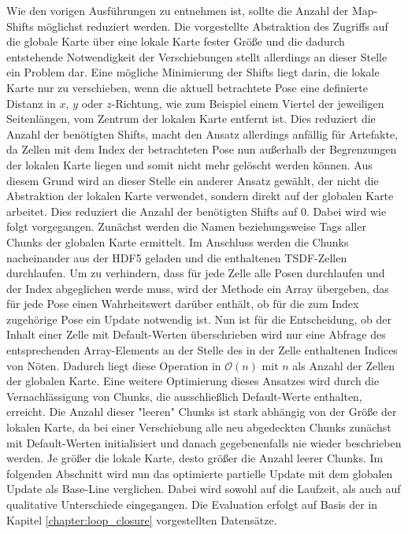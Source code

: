 Wie den vorigen Ausführungen zu entnehmen ist, sollte die Anzahl der Map-Shifts möglichst reduziert werden. Die vorgestellte Abstraktion des Zugriffs auf die globale Karte über eine lokale Karte fester Größe und die dadurch entstehende Notwendigkeit der Verschiebungen stellt allerdings an dieser Stelle ein Problem dar. Eine mögliche Minimierung der Shifts liegt darin, die lokale Karte nur zu verschieben, wenn die aktuell betrachtete Pose eine definierte Distanz in $x$, $y$ oder $z$-Richtung, wie zum Beispiel einem Viertel der jeweiligen Seitenlängen, vom Zentrum der lokalen Karte entfernt ist. Dies reduziert die Anzahl der benötigten Shifts, macht den Ansatz allerdings anfällig für Artefakte, da Zellen mit dem Index der betrachteten Pose nun außerhalb der Begrenzungen der lokalen Karte liegen und somit nicht mehr gelöscht werden können. Aus diesem Grund wird an dieser Stelle ein anderer Ansatz gewählt, der nicht die Abstraktion der lokalen Karte verwendet, sondern direkt auf der globalen Karte arbeitet. Dies reduziert die Anzahl der benötigten Shifts auf $0$. Dabei wird wie folgt vorgegangen. Zunächst werden die Namen beziehungsweise Tags aller Chunks der globalen Karte ermittelt. Im Anschluss werden die Chunks nacheinander aus der HDF5 geladen und die enthaltenen TSDF-Zellen durchlaufen. Um zu verhindern, dass für jede Zelle alle Posen durchlaufen und der Index abgeglichen werde muss, wird der Methode ein Array übergeben, das für jede Pose einen Wahrheitswert darüber enthält, ob für die zum Index zugehörige Pose ein Update notwendig ist. Nun ist für die Entscheidung, ob der Inhalt einer Zelle mit Default-Werten überschrieben wird nur eine Abfrage des entsprechenden Array-Elements an der Stelle des in der Zelle enthaltenen Indices von Nöten. Dadurch liegt diese Operation in $\mathcal{O}(n)$ mit $n$ als Anzahl der Zellen der globalen Karte. Eine weitere Optimierung dieses Ansatzes wird durch die Vernachlässigung von Chunks, die ausschließlich Default-Werte enthalten, erreicht. Die Anzahl dieser "leeren" Chunks ist stark abhängig von der Größe der lokalen Karte, da bei einer Verschiebung alle neu abgedeckten Chunks zunächst mit Default-Werten initialisiert und danach gegebenenfalls nie wieder beschrieben werden. Je größer die lokale Karte, desto größer die Anzahl leerer Chunks. Im folgenden Abschnitt wird nun das optimierte partielle Update mit dem globalen Update als Base-Line verglichen. Dabei wird sowohl auf die Laufzeit, als auch auf qualitative Unterschiede eingegangen. Die Evaluation erfolgt auf Basis der in Kapitel \ref{chapter:loop_closure} vorgestellten Datensätze.


